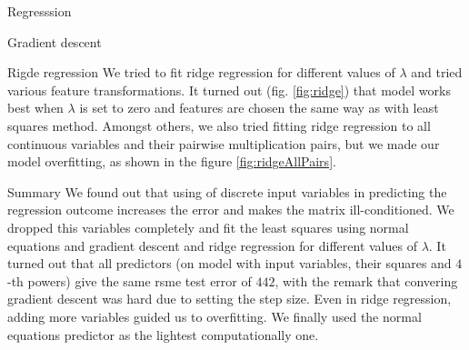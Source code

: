 \documentclass{article}
\begin{document}
\begin{section}{Regresssion}
\begin{subsection}{Gradient descent}
\end{subsection}
\begin{subsection}{Rigde regression}
We tried to fit ridge regression for different values of $\lambda$ and tried various feature transformations. It turned out (fig. \ref{fig:ridge}) that model works best when $\lambda$ is set to zero and features are chosen the same way as with least squares method. Amongst others, we also tried fitting ridge regression to all continuous variables and their pairwise multiplication pairs, but we made our model overfitting, as shown in the figure \ref{fig:ridgeAllPairs}.
\begin{figure}[!h]
\center
{}
\hfill
\caption{}
\end{figure}
\end{subsection}
\begin{subsection}{Summary}
We found out that using of discrete input variables in predicting the regression outcome increases the error and makes the matrix ill-conditioned. We dropped this variables completely and fit the least squares using normal equations and gradient descent and ridge regression for different values of $\lambda$. It turned out that all predictors (on model with input variables, their squares and $4$-th powers) give the same rsme test error of $442$, with the remark that convering gradient descent was hard due to setting the step size. Even in ridge regression, adding more variables guided us to overfitting. We finally used the normal equations predictor as the lightest computationally one.
\end{subsection}
\end{section}
\end{document}

